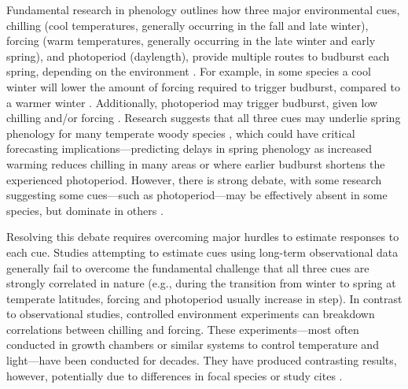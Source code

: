 \documentclass{article}
\begin{document}

\par Fundamental research in phenology outlines how three major environmental cues, chilling (cool temperatures, generally occurring in the fall and late winter), forcing (warm temperatures, generally occurring in the late winter and early spring), and photoperiod (daylength), provide multiple routes to budburst each spring, depending on the environment \citep{chuineJTB}. For example, in some species a cool winter will lower the amount of forcing required to trigger budburst, compared to a warmer winter \citep{harrington2015}. Additionally, photoperiod may trigger budburst, given low chilling and/or forcing \citep{Basler:2014aa, Caffarra:2011b, zohner2016}. Research suggests that all three cues may underlie spring phenology for many temperate woody species \citep{flynn2018,Basler:2014aa,Caffarra:2011qf}, which could have critical forecasting implications---predicting delays in spring phenology as increased warming reduces chilling in many areas \citep{fraga2019} or where earlier budburst shortens the experienced photoperiod. However, there is strong debate, with some research suggesting some cues---such as photoperiod---may be effectively absent in some species, but dominate in others \citep{zohner2016,koerner2010a}. 

\par Resolving this debate requires overcoming major hurdles to estimate responses to each cue. Studies attempting to estimate cues using long-term observational data \citep[e.g.,][]{vitasse2013, zohner2016} generally fail to overcome the fundamental challenge that all three cues are strongly correlated in nature (e.g., during the transition from winter to spring at temperate latitudes, forcing and photoperiod usually increase in step). In contrast to observational studies, controlled environment experiments can breakdown correlations between chilling and forcing. These experiments---most often conducted in growth chambers or similar systems to control temperature and light---have been conducted for decades. They have produced contrasting results, however, potentially  due to differences in focal species or study cites \citep{zohner2016,Laube:2014a,Basler:2012,Caffarra:2011b,Caffarra:2011a}. 
\end{document}
